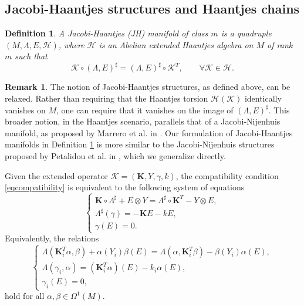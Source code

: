 \documentclass[10pt]{amsart}
\numberwithin{equation}{section}
\newcommand{\beq}{\begin{equation}}
\newcommand{\eeq}{\end{equation}}
\newcommand{\bs}{\boldsymbol}
\newtheorem{definition}{Definition}
\theoremstyle{definition}
\newtheorem{remark}{\textbf{Remark}}
\begin{document}
\subsection{Jacobi-Haantjes structures and Haantjes chains}
\begin{definition}
\label{def:JHM}
A Jacobi-Haantjes (JH) manifold of class $m$ is a quadruple $(M, \Lambda, E, \mathscr{H})$, where $\mathscr{H}$ is an Abelian extended Haantjes algebra on $M$ of rank $m$ such that
\beq
\label{eqcompatibility}
\bs{\mathcal{K}} \circ (\Lambda, E)^{\sharp}= (\Lambda, E)^{\sharp}\circ \bs{\mathcal{K}}^{T}, \qquad \forall \bs{\mathcal{K}} \in \mathscr{H}.
\eeq
\end{definition}
\begin{remark}
The notion of Jacobi-Haantjes structures, as defined above, can be relaxed. Rather than requiring that the Haantjes torsion $\mathcal{H}(\bs{\mathcal{K}})$ identically vanishes on $M$, one can require that it vanishes on the image of $(\Lambda, E)^{\sharp}$. This broader notion, in the Haantjes scenario, parallels that of a Jacobi-Nijenhuis manifold, as proposed by Marrero et al. in \cite{MMPCRAS1999}. Our formulation of Jacobi-Haantjes manifolds in Definition \ref{def:JHM} is more similar to the Jacobi-Nijenhuis structures proposed by Petalidou et al. in \cite{PNJGP2003}, which we generalize directly.
\end{remark}

Given the extended operator $\bs{\mathcal{K}}=(\bs{K}, Y, \gamma, k)$, the compatibility condition \eqref{eqcompatibility} is equivalent to the following system of equations
\begin{equation}
\label{syscompatibility}
\left\lbrace \begin{array}{c}
\bs{K}\circ \Lambda^{\sharp}+E\otimes Y=\Lambda^{\sharp}\circ \bs{K}^{T}-Y\otimes E,\\ 
\Lambda^{\sharp}(\gamma)=-\bs{K}E-kE,\\ 
\gamma(E)=0.
\end{array} \right. 
\end{equation}
Equivalently, the relations
\begin{equation}
\label{systemcc}
\left\lbrace \begin{array}{c}
\Lambda(\bs{K}_{i}^{T}\alpha,\beta)+\alpha(Y_{i})\beta(E)=\Lambda(\alpha,\bs{K}_{i}^{T}\beta)-\beta(Y_{i})\alpha(E), \\ 
\Lambda(\gamma_{i},\alpha)=(\bs{K}_{i}^{T}\alpha)(E)-k_{i}\alpha(E), \\ 
\gamma_{i}(E)=0,
\end{array} \right.
\end{equation}
hold for all $\alpha,\beta\in\Omega^{1}(M)$.
\vspace{2mm}
\end{document}
